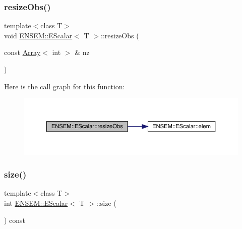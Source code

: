 \subsubsection{\texorpdfstring{resizeObs()}{resizeObs()}\hspace{0.1cm}{\footnotesize\ttfamily [8/8]}}
{\footnotesize\ttfamily template$<$class T$>$ \\
void \mbox{\hyperlink{classENSEM_1_1EScalar}{E\+N\+S\+E\+M\+::\+E\+Scalar}}$<$ T $>$\+::resize\+Obs (\begin{DoxyParamCaption}\item[{const \mbox{\hyperlink{classXMLArray_1_1Array}{Array}}$<$ int $>$ \&}]{nz }\end{DoxyParamCaption})\hspace{0.3cm}{\ttfamily [inline]}}

Here is the call graph for this function\+:
\nopagebreak
\begin{figure}[H]
\begin{center}
\leavevmode
\includegraphics[width=350pt]{d0/d82/classENSEM_1_1EScalar_a9273a529024099effecf6962eafa044e_cgraph}
\end{center}
\end{figure}
\mbox{\label{classENSEM_1_1EScalar_a314f162d71b15a8eb7e3382a274aa12b}} 
\subsubsection{\texorpdfstring{size()}{size()}\hspace{0.1cm}{\footnotesize\ttfamily [1/2]}}
{\footnotesize\ttfamily template$<$class T$>$ \\
int \mbox{\hyperlink{classENSEM_1_1EScalar}{E\+N\+S\+E\+M\+::\+E\+Scalar}}$<$ T $>$\+::size (\begin{DoxyParamCaption}{ }\end{DoxyParamCaption}) const\hspace{0.3cm}{\ttfamily [inline]}}




